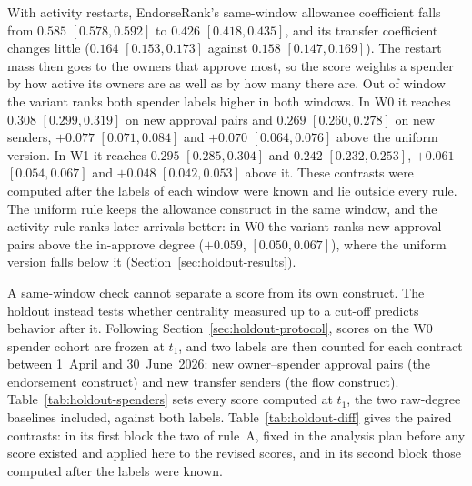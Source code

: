 

With activity restarts, EndorseRank's same-window allowance coefficient falls from $0.585$ $[0.578,0.592]$ to $0.426$ $[0.418,0.435]$, and its transfer coefficient changes little ($0.164$ $[0.153,0.173]$ against $0.158$ $[0.147,0.169]$). The restart mass then goes to the owners that approve most, so the score weights a spender by how active its owners are as well as by how many there are. Out of window the variant ranks both spender labels higher in both windows. In W0 it reaches $0.308$ $[0.299,0.319]$ on new approval pairs and $0.269$ $[0.260,0.278]$ on new senders, $+0.077$ $[0.071,0.084]$ and $+0.070$ $[0.064,0.076]$ above the uniform version. In W1 it reaches $0.295$ $[0.285,0.304]$ and $0.242$ $[0.232,0.253]$, $+0.061$ $[0.054,0.067]$ and $+0.048$ $[0.042,0.053]$ above it. These contrasts were computed after the labels of each window were known and lie outside every rule. The uniform rule keeps the allowance construct in the same window, and the activity rule ranks later arrivals better: in W0 the variant ranks new approval pairs above the in-approve degree ($+0.059$, $[0.050,0.067]$), where the uniform version falls below it (Section~\ref{sec:holdout-results}).


A same-window check cannot separate a score from its own construct. The holdout instead tests whether centrality measured up to a cut-off predicts behavior after it. Following Section~\ref{sec:holdout-protocol}, scores on the W0 spender cohort are frozen at $t_1$, and two labels are then counted for each contract between 1~April and 30~June~2026: new owner--spender approval pairs (the endorsement construct) and new transfer senders (the flow construct). Table~\ref{tab:holdout-spenders} sets every score computed at $t_1$, the two raw-degree baselines included, against both labels. Table~\ref{tab:holdout-diff} gives the paired contrasts: in its first block the two of rule~A, fixed in the analysis plan before any score existed and applied here to the revised scores, and in its second block those computed after the labels were known.





